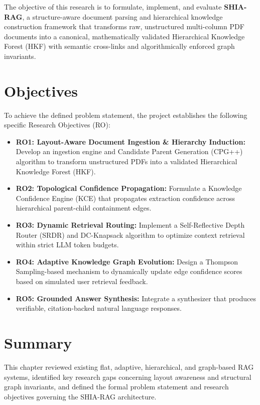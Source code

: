 \documentclass[12pt,a4paper]{report}
\begin{document}
The objective of this research is to formulate, implement, and evaluate \textbf{SHIA-RAG}, a structure-aware document parsing and hierarchical knowledge construction framework that transforms raw, unstructured multi-column PDF documents into a canonical, mathematically validated Hierarchical Knowledge Forest (HKF) with semantic cross-links and algorithmically enforced graph invariants.

\section{Objectives}
To achieve the defined problem statement, the project establishes the following specific Research Objectives (RO):

\begin{itemize}
    \item \textbf{RO1: Layout-Aware Document Ingestion \& Hierarchy Induction:} Develop an ingestion engine and Candidate Parent Generation (CPG++) algorithm to transform unstructured PDFs into a validated Hierarchical Knowledge Forest (HKF).
    \item \textbf{RO2: Topological Confidence Propagation:} Formulate a Knowledge Confidence Engine (KCE) that propagates extraction confidence across hierarchical parent-child containment edges.
    \item \textbf{RO3: Dynamic Retrieval Routing:} Implement a Self-Reflective Depth Router (SRDR) and DC-Knapsack algorithm to optimize context retrieval within strict LLM token budgets.
    \item \textbf{RO4: Adaptive Knowledge Graph Evolution:} Design a Thompson Sampling-based mechanism to dynamically update edge confidence scores based on simulated user retrieval feedback.
    \item \textbf{RO5: Grounded Answer Synthesis:} Integrate a synthesizer that produces verifiable, citation-backed natural language responses.
\end{itemize}
\section{Summary}
This chapter reviewed existing flat, adaptive, hierarchical, and graph-based RAG systems, identified key research gaps concerning layout awareness and structural graph invariants, and defined the formal problem statement and research objectives governing the SHIA-RAG architecture.

\end{document}
